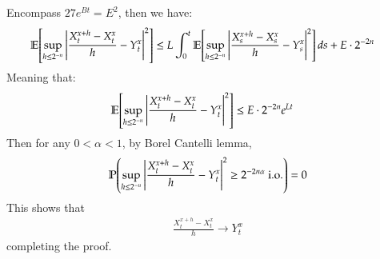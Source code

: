 \documentclass[12pt]{article}
\theoremstyle{definitionstyle}
\newcommand{\1}{\mathds 1}
\renewcommand{\P}{\mathbb P \qty}
\newcommand{\E}{\mathbb E \qty}
\begin{document}
    Encompass $27e^{Bt} = E^2$, then we have:
    \begin{align*}
        \E[\sup_{h \leq 2^{-n}} \qty|\frac{X_t^{x+h} - X_t^x}{h} - Y_t^x|^2] &\leq L\int_0^t \E[\sup_{h \leq 2^{-n}} \qty|\frac{X_s^{x+h} - X_s^x}{h} - Y_s^x|^2] \, ds + E\cdot 2^{-2n}
    \end{align*}
    Meaning that:
    \begin{align*}
        \E[\sup_{h \leq 2^{-n}} \qty|\frac{X_t^{x+h} - X_t^x}{h} - Y_t^x|^2] &\leq E \cdot 2^{-2n} e^{Lt}
    \end{align*}
    Then for any $0 < \alpha < 1$, by Borel Cantelli lemma,
    \begin{align*}
        \P(\sup_{h \leq 2^{-n}} \qty|\frac{X_t^{x+h} - X_t^x}{h} - Y_t^x|^2 \geq 2^{-2n\alpha} \text{ i.o.}) = 0
    \end{align*}
    This shows that 
    \begin{align*}
        \frac{X_t^{x+h} - X_t^x}{h} \to Y_t^x
    \end{align*}
    completing the proof.
    
\end{document}
